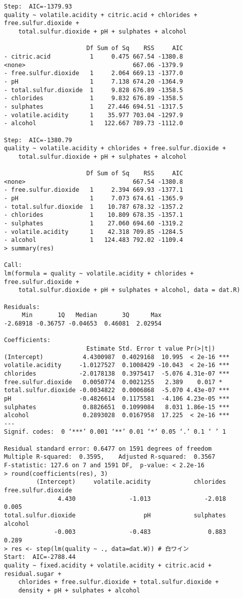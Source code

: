 \documentclass{jsarticle}
\begin{document}
\begin{verbatim}
Step:  AIC=-1379.93
quality ~ volatile.acidity + citric.acid + chlorides + free.sulfur.dioxide + 
    total.sulfur.dioxide + pH + sulphates + alcohol

                       Df Sum of Sq    RSS     AIC
- citric.acid           1     0.475 667.54 -1380.8
<none>                              667.06 -1379.9
- free.sulfur.dioxide   1     2.064 669.13 -1377.0
- pH                    1     7.138 674.20 -1364.9
- total.sulfur.dioxide  1     9.828 676.89 -1358.5
- chlorides             1     9.832 676.89 -1358.5
- sulphates             1    27.446 694.51 -1317.5
- volatile.acidity      1    35.977 703.04 -1297.9
- alcohol               1   122.667 789.73 -1112.0

Step:  AIC=-1380.79
quality ~ volatile.acidity + chlorides + free.sulfur.dioxide + 
    total.sulfur.dioxide + pH + sulphates + alcohol

                       Df Sum of Sq    RSS     AIC
<none>                              667.54 -1380.8
- free.sulfur.dioxide   1     2.394 669.93 -1377.1
- pH                    1     7.073 674.61 -1365.9
- total.sulfur.dioxide  1    10.787 678.32 -1357.2
- chlorides             1    10.809 678.35 -1357.1
- sulphates             1    27.060 694.60 -1319.2
- volatile.acidity      1    42.318 709.85 -1284.5
- alcohol               1   124.483 792.02 -1109.4
> summary(res)

Call:
lm(formula = quality ~ volatile.acidity + chlorides + free.sulfur.dioxide + 
    total.sulfur.dioxide + pH + sulphates + alcohol, data = dat.R)

Residuals:
     Min       1Q   Median       3Q      Max 
-2.68918 -0.36757 -0.04653  0.46081  2.02954 

Coefficients:
                       Estimate Std. Error t value Pr(>|t|)    
(Intercept)           4.4300987  0.4029168  10.995  < 2e-16 ***
volatile.acidity     -1.0127527  0.1008429 -10.043  < 2e-16 ***
chlorides            -2.0178138  0.3975417  -5.076 4.31e-07 ***
free.sulfur.dioxide   0.0050774  0.0021255   2.389    0.017 *  
total.sulfur.dioxide -0.0034822  0.0006868  -5.070 4.43e-07 ***
pH                   -0.4826614  0.1175581  -4.106 4.23e-05 ***
sulphates             0.8826651  0.1099084   8.031 1.86e-15 ***
alcohol               0.2893028  0.0167958  17.225  < 2e-16 ***
---
Signif. codes:  0 ‘***’ 0.001 ‘**’ 0.01 ‘*’ 0.05 ‘.’ 0.1 ‘ ’ 1

Residual standard error: 0.6477 on 1591 degrees of freedom
Multiple R-squared:  0.3595,    Adjusted R-squared:  0.3567 
F-statistic: 127.6 on 7 and 1591 DF,  p-value: < 2.2e-16
> round(coefficients(res), 3)
         (Intercept)     volatile.acidity            chlorides  free.sulfur.dioxide 
               4.430               -1.013               -2.018                0.005 
total.sulfur.dioxide                   pH            sulphates              alcohol 
              -0.003               -0.483                0.883                0.289 
> res <- step(lm(quality ~ ., data=dat.W)) # 白ワイン
Start:  AIC=-2788.44
quality ~ fixed.acidity + volatile.acidity + citric.acid + residual.sugar + 
    chlorides + free.sulfur.dioxide + total.sulfur.dioxide + 
    density + pH + sulphates + alcohol


\end{verbatim}
\end{document}
